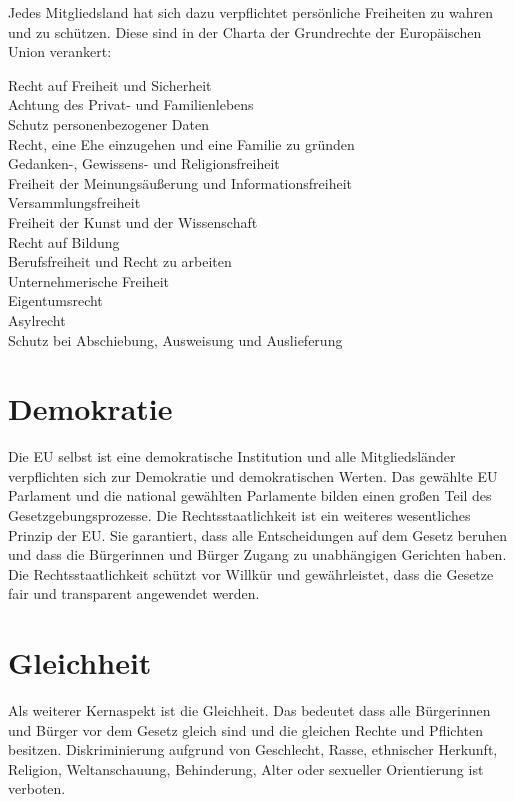 \documentclass[12pt, oneside]{book} %
\begin{document}
Jedes Mitgliedsland hat sich dazu verpflichtet persönliche Freiheiten zu wahren und zu schützen. Diese sind in der Charta der Grundrechte der Europäischen Union verankert:

\begin{description}
    \item[Recht auf Freiheit und Sicherheit]
    \item[Achtung des Privat- und Familienlebens]
    \item[Schutz personenbezogener Daten]
    \item[Recht, eine Ehe einzugehen und eine Familie zu gründen]
    \item[Gedanken-, Gewissens- und Religionsfreiheit]
    \item[Freiheit der Meinungsäußerung und Informationsfreiheit]
    \item[Versammlungsfreiheit]
    \item[Freiheit der Kunst und der Wissenschaft]
    \item[Recht auf Bildung]
    \item[Berufsfreiheit und Recht zu arbeiten]
    \item[Unternehmerische Freiheit]
    \item[Eigentumsrecht]
    \item[Asylrecht]
    \item[Schutz bei Abschiebung, Ausweisung und Auslieferung]
\end{description}

\section{Demokratie}
Die EU selbst ist eine demokratische Institution und alle Mitgliedsländer verpflichten sich zur Demokratie und demokratischen Werten. Das gewählte EU Parlament und die national gewählten Parlamente bilden einen großen Teil des Gesetzgebungsprozesse. Die Rechtsstaatlichkeit ist ein weiteres wesentliches Prinzip der EU. Sie garantiert, dass alle Entscheidungen auf dem Gesetz beruhen und dass die Bürgerinnen und Bürger Zugang zu unabhängigen Gerichten haben. Die Rechtsstaatlichkeit schützt vor Willkür und gewährleistet, dass die Gesetze fair und transparent angewendet werden.

\section{Gleichheit}
Als weiterer Kernaspekt ist die Gleichheit. Das bedeutet dass alle Bürgerinnen und Bürger vor dem Gesetz gleich sind und die gleichen Rechte und Pflichten besitzen. Diskriminierung aufgrund von Geschlecht, Rasse, ethnischer Herkunft, Religion, Weltanschauung, Behinderung, Alter oder sexueller Orientierung ist verboten.
\end{document}
